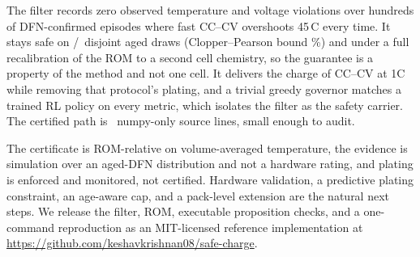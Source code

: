 \documentclass[conference]{IEEEtran}
\newcommand{\SI}[2]{#1\,#2}
\newcommand{\degreeCelsius}{\textdegree C}
\begin{document}
The filter records zero observed temperature and voltage violations over
hundreds of DFN-confirmed episodes where fast CC--CV overshoots \SI{45}{\degreeCelsius} every time.
It stays safe on \valSafe/\valN\ disjoint aged draws (Clopper--Pearson bound \valCP\%) and under a full
recalibration of the ROM to a second cell chemistry, so the guarantee is a property of the method and
not one cell. It delivers the charge of CC--CV at 1C while removing that protocol's plating, and a
trivial greedy governor matches a trained RL policy on every metric, which isolates the filter as the
safety carrier. The certified path is \filterSloc\ numpy-only source lines, small enough to audit.

The certificate is ROM-relative on volume-averaged temperature, the
evidence is simulation over an aged-DFN distribution and not a hardware rating, and plating is enforced
and monitored, not certified. Hardware validation, a predictive plating constraint, an age-aware cap,
and a pack-level extension are the natural next steps. We release the filter, ROM, executable
proposition checks, and a one-command reproduction as an MIT-licensed reference implementation at
\url{https://github.com/keshavkrishnan08/safe-charge}.



\end{document}
